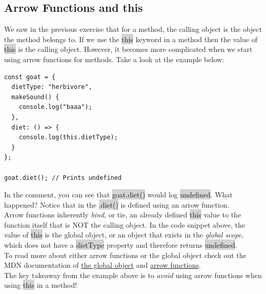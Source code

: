 \documentclass[11pt]{article}
\begin{document}
\subsection{Arrow Functions and this}
We saw in the previous exercise that for a method, the calling object is the object the method belongs to. If we use the \colorbox{lightgray}{this} keyword in a method then the value of \colorbox{lightgray}{this} is the calling object. However, it becomes more complicated when we start using arrow functions for methods. Take a look at the example below:
\begin{lstlisting}
const goat = {
  dietType: "herbivore",
  makeSound() {
    console.log("baaa");
  },
  diet: () => {
    console.log(this.dietType);
  }
};

goat.diet(); // Prints undefined
\end{lstlisting}
In the comment, you can see that \colorbox{lightgray}{goat.diet()} would log \colorbox{lightgray}{undefined}. What happened? Notice that in the \colorbox{lightgray}{.diet()} is defined using an arrow function. \\
\newline
Arrow functions inherently \textit{bind}, or tie, an already defined \colorbox{lightgray}{this} value to the function itself that is NOT the calling object. In the code snippet above, the value of \colorbox{lightgray}{this} is the global object, or an object that exists in the \textit{global scope}, which does not have a \colorbox{lightgray}{dietType} property and therefore returns \colorbox{lightgray}{undefined}. \\
\newline
To read more about either arrow functions or the global object check out the MDN documentation of \href{https://developer.mozilla.org/en-US/docs/Glossary/Global_object}{the global object} and \href{https://developer.mozilla.org/en-US/docs/Web/JavaScript/Reference/Functions/Arrow_functions}{arrow functions}. \\
\newline
The key takeaway from the example above is to \textit{avoid} using arrow functions when using \colorbox{lightgray}{this} in a method!
\end{document}
